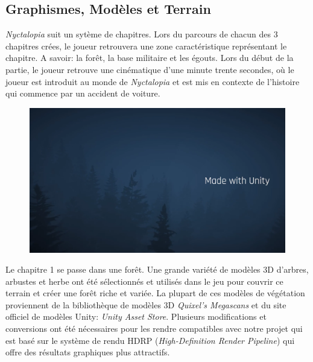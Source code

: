 \subsection{Graphismes, Modèles et Terrain}
\setlength{\parindent}{5ex}

\emph{Nyctalopia} suit un sytème de chapitres. Lors du parcours de chacun des 3 chapitres crées, le joueur retrouvera une zone caractéristique représentant le chapitre. A savoir: la forêt, la base militaire et les égouts. Lors du début de la partie, le joueur retrouve une cinématique d'une minute trente secondes, où le joueur est introduit au monde de \emph{Nyctalopia} et est mis en contexte de l'histoire qui commence par un accident de voiture.

\begin{figure}[H]
\centering
\begin{minipage}{.5\textwidth}
  \centering
  \centerline{\includegraphics[width=1\linewidth]{img/cine.png}}
  \label{fig:cinematique}
\end{minipage}%
\end{figure}

Le chapitre 1 se passe dans une forêt. Une grande variété de modèles 3D d’arbres, arbustes et herbe ont été sélectionnés et utilisés dans le jeu pour couvrir ce terrain et créer une forêt riche et variée. La plupart de ces modèles de végétation proviennent de la bibliothèque de modèles 3D \emph{Quixel’s Megascans} et du site officiel de modèles Unity: \emph{Unity Asset Store}. Plusieurs modifications et conversions ont été nécessaires pour les rendre compatibles avec notre projet qui est basé sur le système de rendu HDRP (\emph{High-Definition Render Pipeline}) qui offre des résultats graphiques plus attractifs.
\newline

